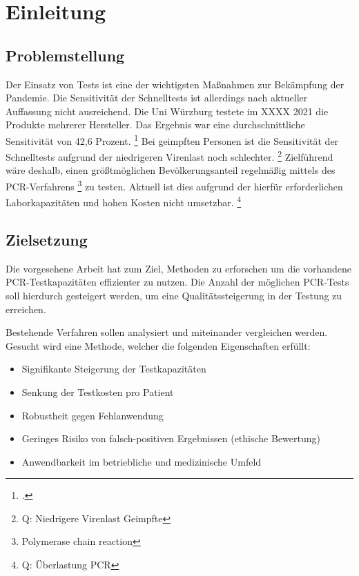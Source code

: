 
\chapter{Einleitung}
\section{Problemstellung}
Der Einsatz von Tests ist eine der wichtigsten Maßnahmen zur Bekämpfung der Pandemie.
Die Sensitivität der Schnelltests ist allerdings nach aktueller Auffassung nicht ausreichend.
Die Uni Würzburg testete im XXXX 2021 die Produkte mehrerer Hersteller.
Das Ergebnis war eine durchschnittliche Sensitivität von 42,6 Prozent.
\footcite{Wuerzburg-Studie}
Bei geimpften Personen ist die Sensitivität der Schnelltests aufgrund der niedrigeren Virenlast noch schlechter.
 \footnote{Q: Niedrigere Virenlast Geimpfte}
Zielführend wäre deshalb, einen größtmöglichen Bevölkerungsanteil regelmäßig mittels des PCR-Verfahrens
\footnote{\acf{Polymerase chain reaction}}
 zu testen.
Aktuell ist dies aufgrund der hierfür erforderlichen Laborkapazitäten und hohen Kosten nicht umsetzbar.
 \footnote{Q: Überlastung PCR}

\section{Zielsetzung}
Die vorgesehene Arbeit hat zum Ziel, Methoden zu erforschen um die vorhandene PCR-Testkapazitäten effizienter zu nutzen.
Die Anzahl der möglichen PCR-Tests soll hierdurch gesteigert werden, um eine Qualitätssteigerung in der Testung zu erreichen.

Bestehende Verfahren sollen analysiert und miteinander vergleichen werden.
Gesucht wird eine Methode, welcher die folgenden Eigenschaften erfüllt:

\begin{itemize}
\item Signifikante Steigerung der Testkapazitäten
\item Senkung der Testkosten pro Patient
\item Robustheit gegen Fehlanwendung
\item Geringes Risiko von falsch-positiven Ergebnissen (ethische Bewertung)
\item Anwendbarkeit im betriebliche und medizinische Umfeld
\end{itemize}

